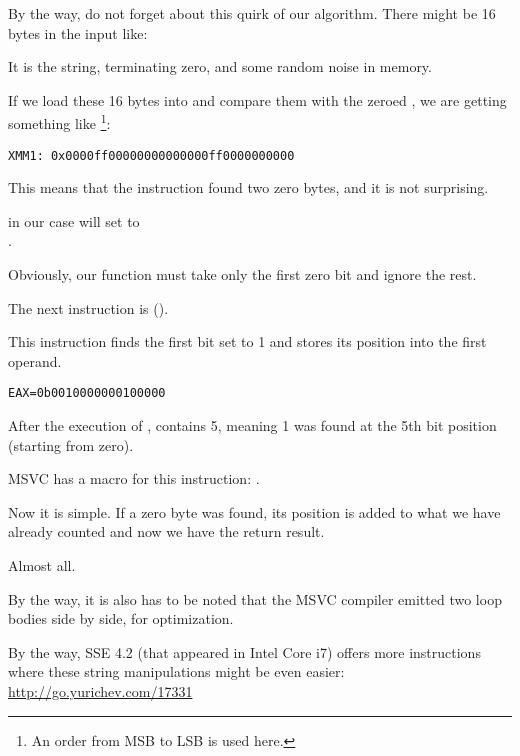 By the way, do not forget about this quirk of our algorithm.
There might be 16 bytes in the input like:



It is the  string, terminating zero, and some random noise in memory.

If we load these 16 bytes into  and compare them with the zeroed , 
we are getting something like
\footnote{An order from \ac{MSB} to \ac{LSB} is used here.}:

\begin{verbatim}
XMM1: 0x0000ff00000000000000ff0000000000
\end{verbatim}

This means that the instruction found two zero bytes, and it is not surprising.
 
 in our case will set \EAX to\\
.

Obviously, our function must take only the first zero bit and ignore the rest.

\label{instruction_BSF}
The next instruction is  (). 

This instruction finds the first bit set to 1 and stores its position into the first operand.

\begin{verbatim}
EAX=0b0010000000100000
\end{verbatim}

After the execution of , \EAX contains 5, meaning 
1 was found at the 5th bit position (starting from zero).

MSVC has a macro for this instruction: .

Now it is simple. If a zero byte was found, its position is added to what we have already counted and now we have 
the return result.

Almost all.

By the way, it is also has to be noted that the MSVC compiler emitted two loop bodies side by side, for optimization.

By the way, SSE 4.2 (that appeared in Intel Core i7) offers more instructions where these string manipulations might be
even easier: \url{http://go.yurichev.com/17331}
